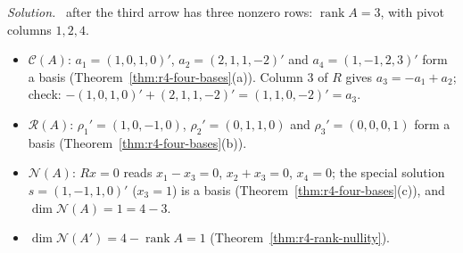 \documentclass[12pt]{article}
\DeclareMathOperator{\rank}{rank}
\theoremstyle{definition}
\newenvironment{solution}{\par\noindent\textit{Solution.}\ }{\par\smallskip}
\begin{document}
\begin{solution}
after the third arrow has three nonzero rows: \(\rank A=3\), with pivot columns \(1,2,4\).
\begin{itemize}
\item \(\mathcal C(A)\): \(a_1=(1,0,1,0)'\), \(a_2=(2,1,1,-2)'\) and \(a_4=(1,-1,2,3)'\) form a basis
(Theorem~\ref{thm:r4-four-bases}(a)). Column \(3\) of \(R\) gives \(a_3=-a_1+a_2\); check:
\(-(1,0,1,0)'+(2,1,1,-2)'=(1,1,0,-2)'=a_3\).
\item \(\mathcal R(A)\): \(\rho_1'=(1,0,-1,0)\), \(\rho_2'=(0,1,1,0)\) and \(\rho_3'=(0,0,0,1)\) form a basis
(Theorem~\ref{thm:r4-four-bases}(b)).
\item \(\mathcal N(A)\): \(Rx=0\) reads \(x_1-x_3=0\), \(x_2+x_3=0\), \(x_4=0\); the special solution
\(s=(1,-1,1,0)'\) (\(x_3=1\)) is a basis (Theorem~\ref{thm:r4-four-bases}(c)), and \(\dim\mathcal N(A)=1=4-3\).
\item \(\dim\mathcal N(A')=4-\rank A=1\) (Theorem~\ref{thm:r4-rank-nullity}).
\end{itemize}
\end{solution}
\end{document}

